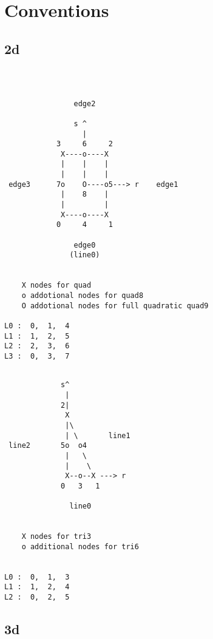 \chapter{Conventions}


\section{2d}

\begin{verbatim}



                edge2

                s ^
                  |
            3     6     2
             X----o----X
             |    |    |
             |    |    |
 edge3      7o    O----o5---> r    edge1
             |    8    |
             |         |
             X----o----X
            0     4     1

                edge0
               (line0)


    X nodes for quad
    o addotional nodes for quad8
    O addotional nodes for full quadratic quad9

L0 :  0,  1,  4
L1 :  1,  2,  5
L2 :  2,  3,  6
L3 :  0,  3,  7

\end{verbatim}



\begin{verbatim}

             s^
              |
             2|
              X
              |\
              | \       line1
 line2       5o  o4
              |   \
              |    \
              X--o--X ---> r
             0   3   1

               line0


    X nodes for tri3
    o additional nodes for tri6


L0 :  0,  1,  3
L1 :  1,  2,  4
L2 :  0,  2,  5

\end{verbatim}





\section{3d}

